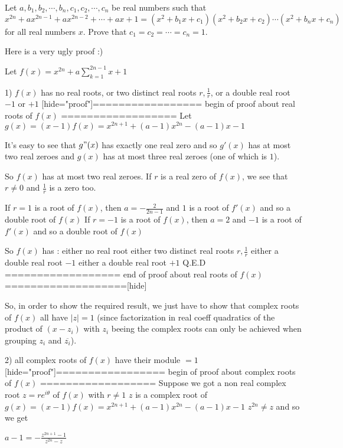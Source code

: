 \begin{solution}
	\begin{tcolorbox}Let $a,b_1,b_2, \cdots,b_n,c_1,c_2,\cdots,c_n$ be real numbers such that
\[x^{2n} + ax^{2n-1} + ax^{2n-2} + \cdots +ax + 1 = (x^2+b_1x+c_1)(x^2+b_2x+c_2) \cdots  (x^2+b_nx+c_n) \]
for all real numbers $x$. Prove that $c_1=c_2=\cdots  = c_n=1$.\end{tcolorbox}
Here is a very ugly proof :)

Let $f(x)=x^{2n}+a\sum_{k=1}^{2n-1}x+1$

1) $f(x)$ has no real roots, or two distinct real roots $r,\frac 1r$, or a double real root $-1$ or $+1$
[hide="proof"]================= begin of proof about real roots of $f(x)$ ==================
Let $g(x)=(x-1)f(x)=x^{2n+1}+(a-1)x^{2n}-(a-1)x-1$

It's easy to see that $g"(x)$ has exactly one real zero and so $g'(x)$ has at most two real zeroes and $g(x)$ has at most three real zeroes (one of which is $1$).

So $f(x)$ has at most two real zeroes. 
If $r$ is a real zero of $f(x)$, we see that $r\ne 0$ and $\frac 1r$ is a zero too.

If $r=1$ is a root of $f(x)$, then $a=-\frac{2}{2n-1}$ and $1$ is a root of $f'(x)$ and so a double root of $f(x)$
If $r=-1$ is a root of $f(x)$, then $a=2$ and $-1$ is a root of $f'(x)$ and so a double root of $f(x)$

So $f(x)$ has :
either no real root
either two distinct real roots $r,\frac 1r$
either a double real root $-1$
either a double real root $+1$
Q.E.D
================== end of proof about real roots of $f(x)$ ===================[\/hide]


So, in order to show the required result, we just have to show that complex roots of $f(x)$ all have $|z|=1$ (since factorization in real coeff quadratics of the product of $(x-z_i)$ with $z_i$ beeing the complex roots  can only be achieved when grouping $z_i$ and $\overline {z_i}$).

2) all complex roots of $f(x)$ have their module $=1$
[hide="proof"]================= begin of proof about complex roots of $f(x)$ ==================
Suppose we got a non real complex root $z=re^{i\theta}$ of $f(x)$ with $r\ne 1$
$z$ is a complex root of $g(x)=(x-1)f(x)=x^{2n+1}+(a-1)x^{2n}-(a-1)x-1$
$z^{2n}\ne z$ and so we get 

$a-1=-\frac{z^{2n+1}-1}{z^{2n}-z}$


\end{solution}
